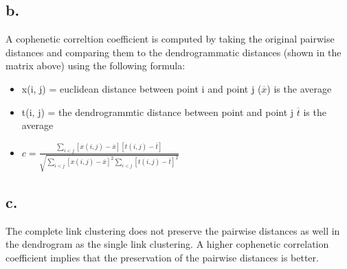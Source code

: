 \documentclass[11pt]{article}
\begin{document}
\subsection*{b.}
\label{sec:orgf33e61c}
A cophenetic correltion coefficient is computed by taking the original pairwise
distances and comparing them to the dendrogrammatic distances (shown in the
matrix above) using the following formula:

\begin{itemize}
\item x(i, j) = euclidean distance between point i and point j (\(\overline x\)) is
the average
\item t(i, j) = the dendrogrammtic distance between point and point j \(\overline
  t\) is the average
\item \(c = \frac{\sum_{i<j}[x(i, j) - \overline x][t(i,j) - \overline t]}{\sqrt{\sum_{i<j}[x(i, j) - \overline x]^2\sum_{i<j}[t(i, j) - \overline t]^2}}\)
\end{itemize}


\subsection*{c.}
\label{sec:orgbc32d2d}
The complete link clustering does not preserve the pairwise distances as well in
the dendrogram as the single link clustering. A higher cophenetic correlation
coefficient implies that the preservation of the pairwise distances is better.
\end{document}
